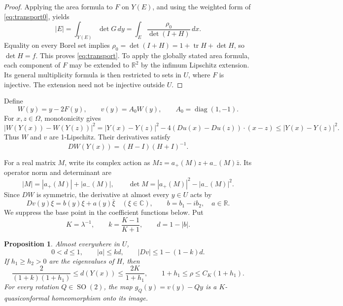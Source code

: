 \documentclass[11pt]{article}
\newtheorem{proposition}{Proposition}[section]
\theoremstyle{remark}
\numberwithin{equation}{section}
\newcommand{\R}{\mathbb R}
\newcommand{\C}{\mathbb C}
\newcommand{\SO}{\operatorname{SO}}
\newcommand{\tr}{\operatorname{tr}}
\begin{document}
\begin{proof}
Applying the area formula to \(F\) on \(Y(E)\), and using the weighted form
of \eqref{eq:transport0}, yields
\[
|E|=\int_{Y(E)}\det G\,dy
=\int_E\frac{\rho_0}{\det(I+H)}\,dx.
\]
Equality on every Borel set implies
\(\rho_0=\det(I+H)=1+\tr H+\det H\), so \(\det H=f\).
This proves \eqref{eq:transport}.
To apply the globally stated area formula, each component of \(F\) may be
extended to \(\R^2\) by the infimum Lipschitz extension. Its general
multiplicity formula is then restricted to sets in \(U\), where \(F\)
is injective. The extension need not be injective outside \(U\).
\end{proof}

Define
\begin{equation}\label{eq:Wv}
W(y)=y-2F(y),\qquad
v(y)=A_0W(y),\qquad A_0=\operatorname{diag}(1,-1).
\end{equation}
For \(x,z\in\Omega\), monotonicity gives
\[
|W(Y(x))-W(Y(z))|^2
=|Y(x)-Y(z)|^2-4(Du(x)-Du(z))\cdot(x-z)
\le |Y(x)-Y(z)|^2.
\]
Thus \(W\) and \(v\) are 1-Lipschitz. Their derivatives satisfy
\begin{equation}\label{eq:cayley}
DW(Y(x))=(H-I)(H+I)^{-1}.
\end{equation}

For a real matrix \(M\), write its complex action as
\(Mz=a_+(M)z+a_-(M)\bar z\). Its operator norm and determinant are
\[
|M|=|a_+(M)|+|a_-(M)|,\qquad
\det M=|a_+(M)|^2-|a_-(M)|^2.
\]
Since \(DW\) is symmetric, the derivative at almost every \(y\in U\) acts by
\begin{equation}\label{eq:complex}
Dv(y)\xi=b(y)\xi+a(y)\bar\xi\quad(\xi\in\C),\qquad
b=b_1-ib_2,\quad a\in\R.
\end{equation}
We suppress the base point in the coefficient functions below. Put
\begin{equation}\label{eq:Kd}
K=\lambda^{-1},\qquad k=\frac{K-1}{K+1},\qquad d=1-|b|.
\end{equation}

\begin{proposition}\label{prop:cone}
Almost everywhere in \(U\),
\begin{equation}\label{eq:cone}
0<d\le1,\qquad |a|\le kd,\qquad
|Dv|\le1-(1-k)d.
\end{equation}
If \(h_1\ge h_2>0\) are the eigenvalues of \(H\), then
\begin{equation}\label{eq:compare}
\frac{2}{(1+k)(1+h_1)}\le d(Y(x))
\le\frac{2K}{1+h_1},
\qquad 1+h_1\le\rho\le C_K(1+h_1).
\end{equation}
For every rotation \(Q\in\SO(2)\), the map
\(g_Q(y)=v(y)-Qy\) is a \(K\)-quasiconformal homeomorphism onto its image.
\end{proposition}
\end{document}
